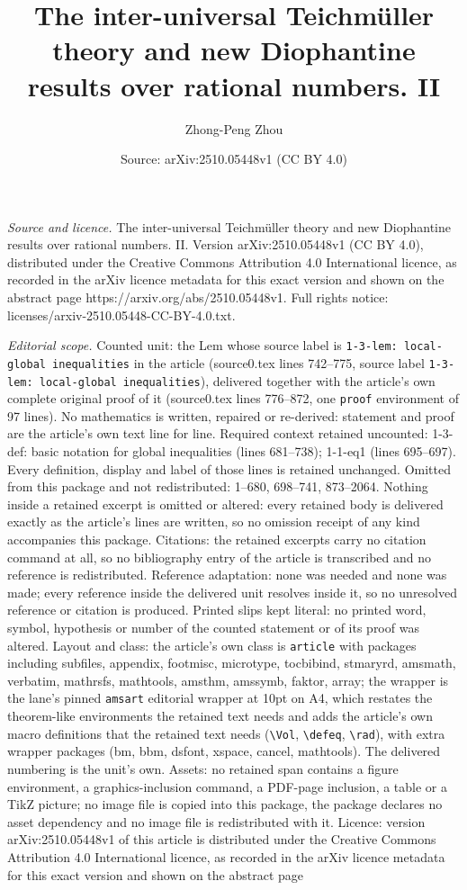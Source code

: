 \documentclass[10pt,a4paper]{amsart}
\title[The inter-universal Teichm\"uller theory and new Diophantine]{The inter-universal Teichm\"uller theory and new Diophantine results over rational numbers. II}
\author{Zhong-Peng Zhou}
\date{Source: arXiv:2510.05448v1 (CC BY 4.0)}
\begin{document}
\maketitle

\noindent\emph{Source and licence.} The inter-universal Teichm\"uller theory and new Diophantine results over rational numbers. II. Version arXiv:2510.05448v1 (CC BY 4.0), distributed under the Creative Commons Attribution 4.0 International licence, as recorded in the arXiv licence metadata for this exact version and shown on the abstract page https://arxiv.org/abs/2510.05448v1. Full rights notice: licenses/arxiv-2510.05448-CC-BY-4.0.txt.\par\smallskip

\noindent\textit{Editorial scope.} Counted unit: the Lem whose source label is \texttt{1-3-lem: local-global inequalities} in the article (source0.tex lines 742--775, source label \texttt{1-3-lem: local-global inequalities}), delivered together with the article's own complete original proof of it (source0.tex lines 776--872, one \texttt{proof} environment of 97 lines). No mathematics is written, repaired or re-derived: statement and proof are the article's own text line for line. Required context retained uncounted: 1-3-def: basic notation for global inequalities (lines 681--738); 1-1-eq1 (lines 695--697). Every definition, display and label of those lines is retained unchanged. Omitted from this package and not redistributed: 1--680, 698--741, 873--2064. Nothing inside a retained excerpt is omitted or altered: every retained body is delivered exactly as the article's lines are written, so no omission receipt of any kind accompanies this package. Citations: the retained excerpts carry no citation command at all, so no bibliography entry of the article is transcribed and no reference is redistributed. Reference adaptation: none was needed and none was made; every reference inside the delivered unit resolves inside it, so no unresolved reference or citation is produced. Printed slips kept literal: no printed word, symbol, hypothesis or number of the counted statement or of its proof was altered. Layout and class: the article's own class is \texttt{article} with packages including subfiles, appendix, footmisc, microtype, tocbibind, stmaryrd, amsmath, verbatim, mathrsfs, mathtools, amsthm, amssymb, faktor, array; the wrapper is the lane's pinned \texttt{amsart} editorial wrapper at 10pt on A4, which restates the theorem-like environments the retained text needs and adds the article's own macro definitions that the retained text needs (\texttt{\textbackslash Vol}, \texttt{\textbackslash defeq}, \texttt{\textbackslash rad}), with extra wrapper packages (bm, bbm, dsfont, xspace, cancel, mathtools). The delivered numbering is the unit's own. Assets: no retained span contains a figure environment, a graphics-inclusion command, a PDF-page inclusion, a table or a TikZ picture; no image file is copied into this package, the package declares no asset dependency and no image file is redistributed with it. Licence: version arXiv:2510.05448v1 of this article is distributed under the Creative Commons Attribution 4.0 International licence, as recorded in the arXiv licence metadata for this exact version and shown on the abstract page 
\end{document}
